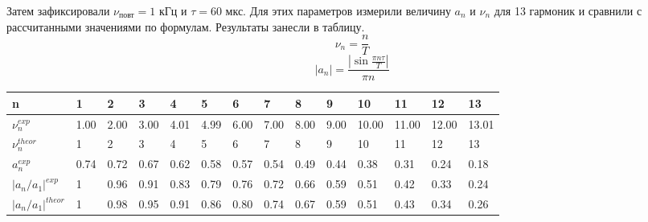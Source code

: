 \documentclass[a4paper,12pt]{article}
\begin{document}
Затем зафиксировали $\nu_{\text{повт}} = 1$ кГц и $\tau = 60$ мкс. Для этих параметров измерили величину $a_n$ и $\nu_n$ для 13 гармоник и сравнили с рассчитанными значениями по формулам. Результаты занесли в таблицу.
\[\nu_n = \frac{n}{T} \]
\[|a_n| = \frac{|\sin{ \frac{\pi n \tau}{T}}|}{\pi n}\]


\begin{table}[]
\begin{tabular}{|l|l|l|l|l|l|l|l|l|l|l|l|l|l|}
\hline
n                        & 1    & 2    & 3    & 4    & 5    & 6    & 7    & 8    & 9    & 10    & 11    & 12    & 13    \\ \hline
$\nu_n^{exp}$            & 1.00 & 2.00 & 3.00 & 4.01 & 4.99 & 6.00 & 7.00 & 8.00 & 9.00 & 10.00 & 11.00 & 12.00 & 13.01 \\ \hline
$\nu_n^{theor}$          & 1    & 2    & 3    & 4    & 5    & 6    & 7    & 8    & 9    & 10    & 11    & 12    & 13    \\ \hline
$a_n^{exp}$                & 0.74 & 0.72 & 0.67 & 0.62 & 0.58 & 0.57 & 0.54 & 0.49 & 0.44 & 0.38  & 0.31  & 0.24  & 0.18  \\ \hline
$|a_n / a_1|^{exp}$          & 1    & 0.96 & 0.91 & 0.83 & 0.79 & 0.76 & 0.72 & 0.66 & 0.59 & 0.51  & 0.42  & 0.33  & 0.24  \\ \hline
$|a_n / a_1|^{theor}$        & 1    & 0.98 & 0.95 & 0.91 & 0.86 & 0.80 & 0.74 & 0.67 & 0.59 & 0.51  & 0.43  & 0.34  & 0.26  \\ \hline
\end{tabular}
\end{table}
\end{document}
